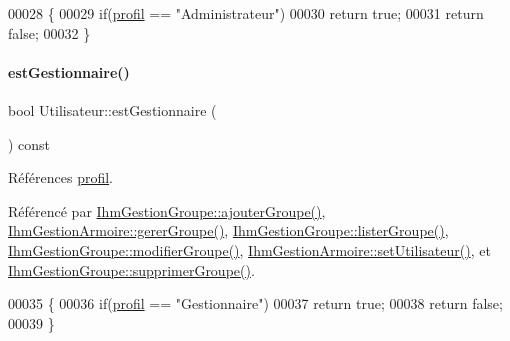 \begin{DoxyCode}
00028 \{
00029     \textcolor{keywordflow}{if}(\hyperlink{class_utilisateur_ab03707f32fadf99ae0a0a27d59470646}{profil} == \textcolor{stringliteral}{"Administrateur"})
00030         \textcolor{keywordflow}{return} \textcolor{keyword}{true};
00031     \textcolor{keywordflow}{return} \textcolor{keyword}{false};
00032 \}
\end{DoxyCode}
\mbox{\label{class_utilisateur_a3c86ddd77b243fd3f12ad2e85ff06759}} 
\paragraph{\texorpdfstring{est\+Gestionnaire()}{estGestionnaire()}}
{\footnotesize\ttfamily bool Utilisateur\+::est\+Gestionnaire (\begin{DoxyParamCaption}{ }\end{DoxyParamCaption}) const}



Références \hyperlink{class_utilisateur_ab03707f32fadf99ae0a0a27d59470646}{profil}.



Référencé par \hyperlink{class_ihm_gestion_groupe_a5e5b11cb395970f64b30427ccb2ecf4d}{Ihm\+Gestion\+Groupe\+::ajouter\+Groupe()}, \hyperlink{class_ihm_gestion_armoire_a4cd664c766e29593d3fedf2baea6a330}{Ihm\+Gestion\+Armoire\+::gerer\+Groupe()}, \hyperlink{class_ihm_gestion_groupe_a7afabe81c405b35e7cfd4e760eda8c84}{Ihm\+Gestion\+Groupe\+::lister\+Groupe()}, \hyperlink{class_ihm_gestion_groupe_a810c186bf38dab776c7167c85671b268}{Ihm\+Gestion\+Groupe\+::modifier\+Groupe()}, \hyperlink{class_ihm_gestion_armoire_af63a0c4424edd90a3c45506dde527b4e}{Ihm\+Gestion\+Armoire\+::set\+Utilisateur()}, et \hyperlink{class_ihm_gestion_groupe_a08bdd132a37ac574b15d00e4dc959d7f}{Ihm\+Gestion\+Groupe\+::supprimer\+Groupe()}.


\begin{DoxyCode}
00035 \{
00036     \textcolor{keywordflow}{if}(\hyperlink{class_utilisateur_ab03707f32fadf99ae0a0a27d59470646}{profil} == \textcolor{stringliteral}{"Gestionnaire"})
00037         \textcolor{keywordflow}{return} \textcolor{keyword}{true};
00038     \textcolor{keywordflow}{return} \textcolor{keyword}{false};
00039 \}
\end{DoxyCode}
\mbox{\label{class_utilisateur_a9b01ce9996c2242b1be952c3c7574fac}} 
